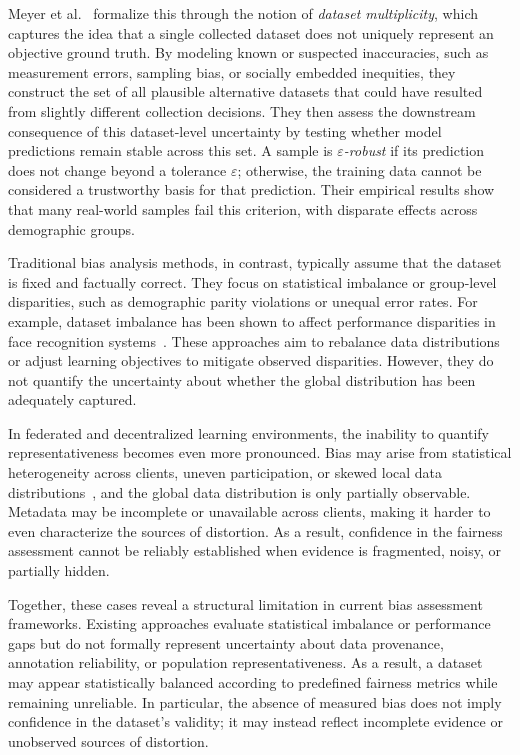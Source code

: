Meyer et al.~\cite{meyer2023multiplicity} formalize this through the notion of \emph{dataset multiplicity}, which captures the idea that a single collected dataset does not uniquely represent an objective ground truth. By modeling known or suspected inaccuracies, such as measurement errors, sampling bias, or socially embedded inequities, they construct the set of all plausible alternative datasets that could have resulted from slightly different collection decisions. They then assess the downstream consequence of this dataset-level uncertainty by testing whether model predictions remain stable across this set. A sample is \emph{$\varepsilon$-robust} if its prediction does not change beyond a tolerance $\varepsilon$; otherwise, the training data cannot be considered a trustworthy basis for that prediction. Their empirical results show that many real-world samples fail this criterion, with disparate effects across demographic groups.

Traditional bias analysis methods, in contrast, typically assume that the dataset is fixed and factually correct. They focus on statistical imbalance or group-level disparities, such as demographic parity violations or unequal error rates. For example, dataset imbalance has been shown to affect performance disparities in face recognition systems~\cite{10.1145/3600211.3604691}. These approaches aim to rebalance data distributions or adjust learning objectives to mitigate observed disparities. However, they do not quantify the uncertainty about whether the global distribution has been adequately captured.

In federated and decentralized learning environments, the inability to quantify representativeness becomes even more pronounced. Bias may arise from statistical heterogeneity across clients, uneven participation, or skewed local data distributions~\cite{electronics13234664}, and the global data distribution is only partially observable. Metadata may be incomplete or unavailable across clients, making it harder to even characterize the sources of distortion. As a result, confidence in the fairness assessment cannot be reliably established when evidence is fragmented, noisy, or partially hidden.

Together, these cases reveal a structural limitation in current bias assessment frameworks. Existing approaches evaluate statistical imbalance or performance gaps but do not formally represent uncertainty about data provenance, annotation reliability, or population representativeness. As a result, a dataset may appear statistically balanced according to predefined fairness metrics while remaining unreliable. In particular, the absence of measured bias does not imply confidence in the dataset's validity; it may instead reflect incomplete evidence or unobserved sources of distortion.



